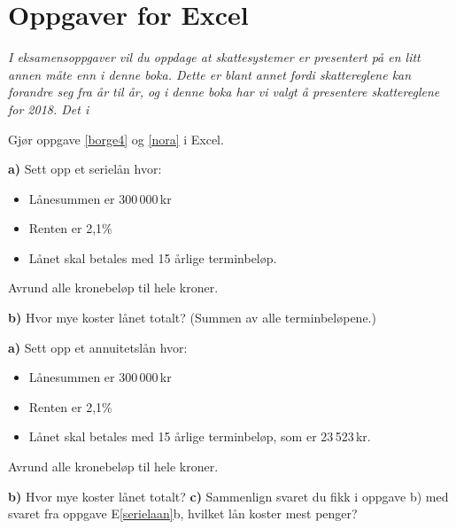 



{} 
\section*{Oppgaver for Excel}

\obs \textsl{I eksamensoppgaver vil du oppdage at skattesystemer er presentert på en litt annen måte enn i denne boka. Dette er blant annet fordi skattereglene kan forandre seg fra år til år, og i denne boka har vi valgt å presentere skattereglene for 2018. Det i }

Gjør oppgave \ref{borge4} og \ref{nora} i Excel.

\textbf{a)} Sett opp et serielån hvor:
\begin{itemize}
	\item Lånesummen er 300\,000\,kr
	\item Renten er 2,1\%
	\item Lånet skal betales med 15 årlige terminbeløp.
\end{itemize}
Avrund alle kronebeløp til hele kroner.\os

\textbf{b)} Hvor mye koster lånet totalt? (Summen av alle terminbeløpene.)

\textbf{a)} Sett opp et annuitetslån hvor:
\begin{itemize}
	\item Lånesummen er 300\,000\,kr
	\item Renten er 2,1\%
	\item Lånet skal betales med 15 årlige terminbeløp, som er 23\,523\,kr.
\end{itemize}
Avrund alle kronebeløp til hele kroner.\os

\textbf{b)} Hvor mye koster lånet totalt? \os
\textbf{c)} Sammenlign svaret du fikk i oppgave b) med svaret fra oppgave E\ref{serielaan}b, hvilket lån koster mest penger?\os

